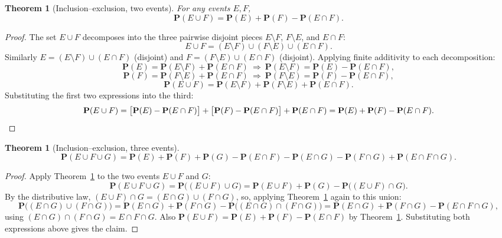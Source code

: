 \documentclass[11pt]{article}
\theoremstyle{definition}
\theoremstyle{plain}
\newtheorem{theorem}[definition]{Theorem}
\theoremstyle{remark}
\begin{document}
\begin{theorem}[Inclusion--exclusion, two events]
\label{thm:incl-excl-2}
For any events $E, F$,
\[
\mathbf{P}(E \cup F) = \mathbf{P}(E) + \mathbf{P}(F) - \mathbf{P}(E\cap F).
\]
\end{theorem}
\begin{proof}
The set $E \cup F$ decomposes into the three pairwise disjoint pieces $E\setminus F$,
$F \setminus E$, and $E \cap F$:
\[
E \cup F = (E\setminus F) \cup (F\setminus E) \cup (E\cap F).
\]
Similarly $E = (E\setminus F)\cup(E\cap F)$ (disjoint) and $F=(F\setminus E)\cup(E\cap F)$
(disjoint). Applying finite additivity to each decomposition:
\[
\mathbf{P}(E) = \mathbf{P}(E\setminus F) + \mathbf{P}(E\cap F)
\ \Longrightarrow\ \mathbf{P}(E\setminus F) = \mathbf{P}(E) - \mathbf{P}(E\cap F),
\]
\[
\mathbf{P}(F) = \mathbf{P}(F\setminus E) + \mathbf{P}(E\cap F)
\ \Longrightarrow\ \mathbf{P}(F\setminus E) = \mathbf{P}(F) - \mathbf{P}(E\cap F),
\]
\[
\mathbf{P}(E\cup F) = \mathbf{P}(E\setminus F)+\mathbf{P}(F\setminus E)+\mathbf{P}(E\cap F).
\]
Substituting the first two expressions into the third:
\[
\mathbf{P}(E\cup F) = \big[\mathbf{P}(E)-\mathbf{P}(E\cap F)\big] +
\big[\mathbf{P}(F)-\mathbf{P}(E\cap F)\big] + \mathbf{P}(E\cap F)
= \mathbf{P}(E)+\mathbf{P}(F)-\mathbf{P}(E\cap F). \qedhere
\]
\end{proof}

\begin{theorem}[Inclusion--exclusion, three events]
\[
\mathbf{P}(E\cup F\cup G) = \mathbf{P}(E)+\mathbf{P}(F)+\mathbf{P}(G)
-\mathbf{P}(E\cap F)-\mathbf{P}(E\cap G)-\mathbf{P}(F\cap G)+\mathbf{P}(E\cap F\cap G).
\]
\end{theorem}
\begin{proof}
Apply Theorem~\ref{thm:incl-excl-2} to the two events $E\cup F$ and $G$:
\[
\mathbf{P}(E\cup F\cup G) = \mathbf{P}\big((E\cup F)\cup G\big)
= \mathbf{P}(E\cup F) + \mathbf{P}(G) - \mathbf{P}\big((E\cup F)\cap G\big).
\]
By the distributive law, $(E\cup F)\cap G = (E\cap G)\cup(F\cap G)$, so, applying
Theorem~\ref{thm:incl-excl-2} again to this union:
\[
\mathbf{P}\big((E\cap G)\cup(F\cap G)\big) = \mathbf{P}(E\cap G)+\mathbf{P}(F\cap G)
-\mathbf{P}\big((E\cap G)\cap(F\cap G)\big) = \mathbf{P}(E\cap G)+\mathbf{P}(F\cap G)-\mathbf{P}(E\cap F\cap G),
\]
using $(E\cap G)\cap(F\cap G) = E\cap F\cap G$. Also $\mathbf{P}(E\cup F) = \mathbf{P}(E)+\mathbf{P}(F)-\mathbf{P}(E\cap F)$
by Theorem~\ref{thm:incl-excl-2}. Substituting both expressions above gives the claim.
\end{proof}
\end{document}
